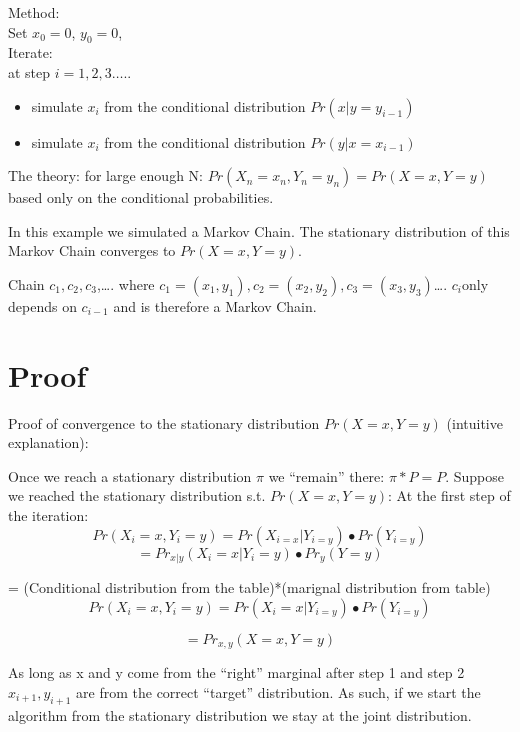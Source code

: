 \documentclass[12pt]{report}
\begin{document}
Method: \\
Set $x_0=0$, $y_0=0$, \\
Iterate: \\
at step $i=1,2,3…..$ \\
\begin{itemize}
\item  simulate $x_i$ from the conditional distribution $Pr(x|y=y_{i-1})$
\item  simulate $x_i$ from the conditional distribution $Pr(y|x=x_{i-1})$
\end{itemize}

The theory: for large enough N: $Pr(X_n=x_n,Y_n=y_n ) =Pr(X=x,Y=y)$
based only on the conditional probabilities. 

In this example we simulated a Markov Chain. The stationary distribution of this Markov Chain converges to $Pr(X=x,Y=y)$.


Chain $c_1,c_2,c_3$,…. where $c_1=(x_1,y_1 ),c_2=(x_2,y_2
),c_3=(x_3,y_3 )$…. $c_i $only depends on $c_{i-1}$ and is therefore a Markov Chain.

\section{Proof}
Proof of convergence to the stationary distribution $Pr(X=x,Y=y)$ (intuitive explanation):

Once we reach a stationary distribution $\pi$ we “remain” there:
$\pi*P = P$. Suppose we reached the stationary distribution s.t. $Pr(X=x,Y=y)$:
At the first step of the iteration: 
\begin{equation}
Pr(X_i=x,Y_i=y)= Pr(X_{i=x}|Y_{i=y})∙Pr(Y_{i=y})
\end{equation}
\begin{equation}
=Pr_{x|y}(X_i=x|Y_i=y)∙Pr_y (Y=y)
\end{equation}

= (Conditional distribution from the table)*(marignal distribution from table)
\begin{equation}
Pr(X_i=x,Y_i=y)= Pr(X_i=x|Y_{i=y})∙Pr(Y_{i=y})
\end{equation}

\begin{equation}
=Pr_{x,y} (X=x,Y=y)
\end{equation}


As long as x and y come from the “right” marginal after step 1 and step 2 $x_{i+1},y_{i+1}$ are from the correct “target” distribution. 
As such, if we start the algorithm from the stationary distribution we stay at the joint distribution. 
\end{document}
